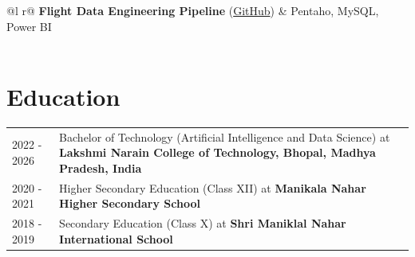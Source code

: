 \documentclass[a4paper,12pt]{article}
\begin{document}
\vspace{10pt}

\begin{tabularx}{\linewidth}{ @{}l r@{} }
\textbf{Flight Data Engineering Pipeline} \normalsize{(\href{https://github.com/Rider-04/flight-data-engineering-pipeline.git}{GitHub})} & \hfill \normalsize{Pentaho, MySQL, Power BI} \\[3.75pt]
 \\
\end{tabularx}

\vspace{10pt}


\section{Education}
\begin{tabularx}{\linewidth}{@{}l X@{}}
2022 - 2026 & Bachelor of Technology (Artificial Intelligence and Data Science) at \textbf{Lakshmi Narain College of Technology, Bhopal, Madhya Pradesh, India} \hfill  \\[12pt]
2020 - 2021 & Higher Secondary Education (Class XII) at \textbf{Manikala Nahar Higher Secondary School} \hfill  \\[12pt]
2018 - 2019 & Secondary Education (Class X) at \textbf{Shri Maniklal Nahar International School} \hfill  \\
\end{tabularx}
\end{document}
